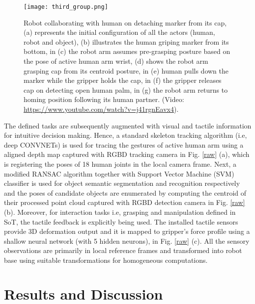 \documentclass[letterpaper, 10 pt, conference]{ieeeconf}  %
\begin{document}
   \begin{figure*}[h]
      \centering
      \texttt{[image: third\_group.png]}
      \caption{Robot collaborating with human on detaching marker from its cap, (a) represents the initial configuration of all the actors (human, robot and object), (b) illustrates the human griping marker from its bottom, in (c) the robot arm assumes pre-grasping posture based on the pose of active human arm wrist, (d) shows the robot arm grasping cap from its centroid posture, in (e) human pulls down the marker while the gripper holds the cap, in (f) the gripper releases cap on detecting open human palm, in (g) the robot arm returns to homing position following its human partner. (Video: \url{https://www.youtube.com/watch?v=j41rgnEavx4}).}
      \label{nine}
      \vspace{-15pt}
   \end{figure*}
   
The defined tasks are subsequently augmented with visual and tactile information for intuitive decision making. Hence, a standard skeleton tracking algorithm (i.e, deep CONVNETs) \cite{c11} is used for tracing the gestures of active human arm using a aligned depth map captured with RGBD tracking camera in Fig. \ref{raw} (a), which is registering the poses of 18 human joints in the local camera frame. Next, a modified RANSAC algorithm together with Support Vector Machine (SVM) classifier is used for object semantic segmentation and recognition respectively and the poses of candidate objects are enumerated by computing the centroid of their processed point cloud captured with RGBD detection camera in Fig. \ref{raw} (b). Moreover, for interaction tasks i.e, grasping and manipulation defined in SoT, the tactile feedback is explicitly being used. The installed tactile sensors \cite{c12} provide 3D deformation output and it is mapped to gripper's force profile using a shallow neural network (with 5 hidden neurons), in Fig. \ref{raw} (c). All the sensory observations are primarily in local reference frames and transformed into robot base using suitable transformations for homogeneous computations. 
   
\section{Results and Discussion}
\end{document}
